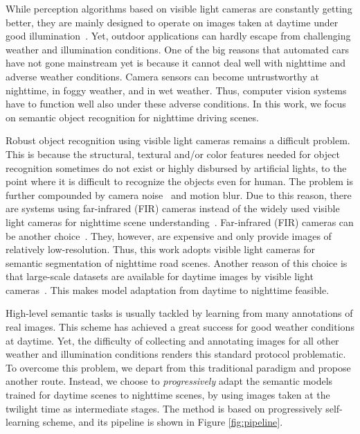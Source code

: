\documentclass[letterpaper, 10 pt, conference]{ieeeconf}
\begin{document}
While perception algorithms based on visible light cameras are constantly getting better, they are mainly designed to operate on images taken at daytime under good illumination~\cite{vision:atmosphere,semantic:foggy:scene}. Yet, outdoor applications can hardly escape from challenging weather and illumination conditions. One of the big reasons that automated cars have not gone mainstream yet is because it cannot deal well with nighttime and adverse weather conditions. Camera sensors can become untrustworthy at nighttime, in foggy weather, and in wet weather. Thus, computer vision systems have to function well also under these adverse conditions. In this work, we focus on semantic object recognition for nighttime driving scenes.

Robust object recognition using visible light cameras remains a difficult problem. This is because the structural, textural and/or color features needed for object recognition sometimes do not exist or highly disbursed by artificial lights, to the point where it is difficult to recognize the objects even for human. The problem is further compounded by camera noise~\cite{nighttime:noise:reduction:16} and motion blur. Due to this reason, there are systems using  far-infrared (FIR) cameras instead of the widely used visible light cameras for nighttime scene understanding~\cite{night:vision:pedestrian:05,day:night:16}. 
Far-infrared (FIR) cameras can be another choice~\cite{night:vision:pedestrian:05,day:night:16}. They, however, are expensive and only provide images of relatively low-resolution. Thus, this work adopts visible light cameras for semantic segmentation of nighttime road scenes. Another reason of this choice is that large-scale datasets are available for daytime images by visible light cameras~\cite{Cityscapes}. This makes model adaptation from daytime to nighttime feasible. 

High-level semantic tasks is usually tackled by learning from many annotations of real images. This scheme has achieved a great success for good weather conditions at daytime. Yet, the difficulty of collecting and annotating images for all other weather and illumination conditions renders this standard protocol problematic. To overcome this problem, we depart from this traditional paradigm and propose another route. Instead, we choose to \emph{progressively} adapt the semantic models trained for daytime scenes to nighttime scenes, by using images taken at the twilight time as intermediate stages. The method is based on progressively self-learning scheme, and its  pipeline is shown in Figure \ref{fig:pipeline}. 
\end{document}
